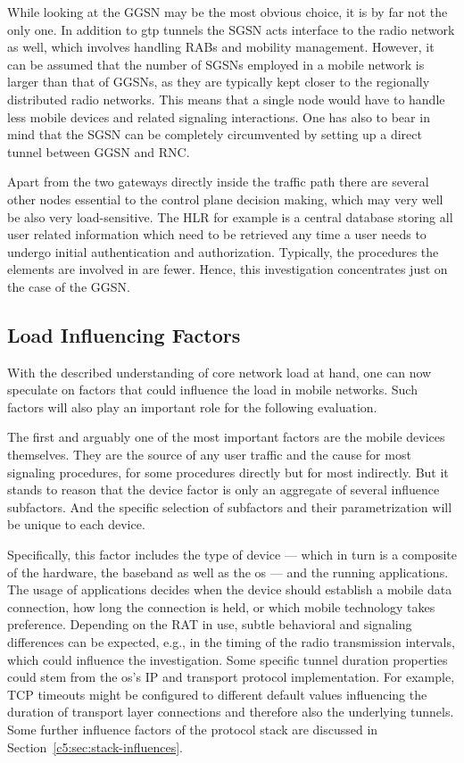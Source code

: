 While looking at the \gls{GGSN} may be the most obvious choice, it is by far not the only one. In addition to \gls{gtp} tunnels the \gls{SGSN} acts interface to the radio network as well, which involves handling \glspl{RAB} and mobility management. However, it can be assumed that the number of \glspl{SGSN} employed in a mobile network is larger than that of \glspl{GGSN}, as they are typically kept closer to the regionally distributed radio networks. This means that a single node would have to handle less mobile devices and related signaling interactions. One has also to bear in mind that the \gls{SGSN} can be completely circumvented by setting up a direct tunnel between \gls{GGSN} and \gls{RNC}.

Apart from the two gateways directly inside the traffic path there are several other nodes essential to the control plane decision making, which may very well be also very load-sensitive. The \gls{HLR} for example is a central database storing all user related information which need to be retrieved any time a user needs to undergo initial authentication and authorization. Typically, the procedures the elements are involved in are fewer. Hence, this investigation concentrates just on the case of the \gls{GGSN}.


\subsection{Load Influencing Factors}

With the described understanding of core network load at hand, one can now speculate on factors that could influence the load in mobile networks. Such factors will also play an important role for the following evaluation.

The first and arguably one of the most important factors are the mobile devices themselves. They are the source of any user traffic and the cause for most signaling procedures, for some procedures directly but for most indirectly. But it stands to reason that the device factor is only an aggregate of several influence subfactors. And the specific selection of subfactors and their parametrization will be unique to each device.

Specifically, this factor includes the type of device --- which in turn is a composite of the hardware, the baseband as well as the \gls{os} --- and the running applications. The usage of applications decides when the device should establish a mobile data connection, how long the connection is held, or which mobile technology takes preference. Depending on the \gls{RAT} in use, subtle behavioral and signaling differences can be expected, e.g., in the timing of the radio transmission intervals, which could influence the investigation. Some specific tunnel duration properties could stem from the \gls{os}'s \gls{IP} and transport protocol implementation. For example, \gls{TCP} timeouts might be configured to different default values influencing the duration of transport layer connections and therefore also the underlying tunnels. Some further influence factors of the protocol stack are discussed in Section~\ref{c5:sec:stack-influences}.

